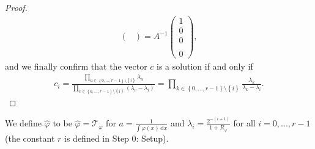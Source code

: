 \begin{proof}
\begin{align*}
\begin{pmatrix}
        \end{pmatrix}
        = A^{-1}\begin{pmatrix}
            1 \\ 0 \\ 0 \\ \\ 0
        \end{pmatrix},
    \end{align*}
    and we finally confirm that the vector \(c\) is a solution if and only if  
    \begin{align*}
        c_i = \frac{\prod\limits_{u \in \left\{ 0,...,r-1 \right\} \setminus \left\{ i \right\} }\lambda_u}{\prod\limits_{v \in \left\{ 0,...,r-1 \right\} \setminus \left\{ i \right\}} (\lambda_v - \lambda_i)} = \prod\limits_{k \in \left\{ 0,...,r-1 \right\} \setminus \left\{ i \right\}} \frac{\lambda_k}{\lambda_k - \lambda_i}.
    \end{align*}
\end{proof}

We define \(\hat \varphi\) to be \(\hat \varphi = \mathcal{T}_{\varphi}\) for \(a = \frac{1}{\int \varphi(x) \, \mathrm{d}x}\) and \(\lambda_i = \frac{2^{-(i+1)}}{1+R_\varphi}\) for all \(i = 0,...,r-1\) (the constant \(r\) is defined in Step 0: Setup).   
    

